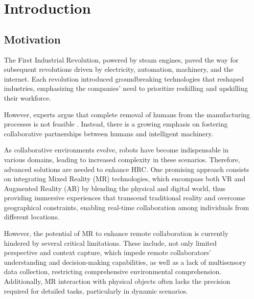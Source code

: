 \chapter{Introduction}%
\label{chapter:introduction}


\section{Motivation}
\label{section:Motivation}
% 
The First Industrial Revolution, powered by steam engines, paved the way for subsequent revolutions driven by electricity, automation, machinery, 
and the internet. Each revolution introduced groundbreaking technologies that reshaped industries, emphasizing the companies' need to prioritize reskilling 
and upskilling their workforce.

However, experts argue that complete removal of humans from the manufacturing processes is not feasible \cite{Weiss2021}. Instead, there is 
a growing emphasis on fostering collaborative partnerships between humans and intelligent machinery.

As collaborative environments evolve, robots have become indispensable in various domains, leading to increased complexity in these scenarios.  Therefore, advanced solutions are needed to enhance \ac{HRC}. 
One promising approach consists on integrating Mixed Reality (\ac{MR}) technologies, which encompass both \ac{VR} and Augmented Reality (\ac{AR}) by blending the physical and digital world, thus providing immersive experiences that transcend traditional reality and overcome geographical constraints, enabling real-time collaboration among individuals from different locations.

However, the potential of \ac{MR} to enhance remote collaboration is currently hindered by several critical limitations. These include, not only limited perspective and context capture, which impede remote collaborators' understanding and decision-making capabilities, as well as a lack of multisensory data collection, restricting comprehensive environmental comprehension. 
Additionally, \ac{MR} interaction with physical objects often lacks the precision required for detailed tasks, particularly in dynamic scenarios. 

